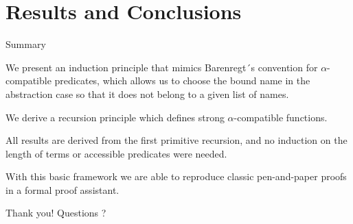 \documentclass[utf,utf8x,hyperref=hidelinks,xcolor=table]{beamer} %
\newcommand{\alp}{\ensuremath{\alpha}}
\begin{document}
\section{Results and Conclusions} 
\begin{frame}{Summary} \medskip


We present an induction principle that mimics Barenregt´s convention for $\alpha$-compatible predicates, which allows us to choose the bound name in the abstraction case so that it does not belong to a given list of names. \bigskip \bigskip

\pause

We derive a recursion principle which defines strong \alp-compatible functions. \bigskip
\pause

All results are derived from the first primitive recursion, and no induction on the length of terms or accessible predicates were needed. \bigskip \bigskip

\pause

With this basic framework we are able to reproduce classic pen-and-paper proofs in a formal proof assistant.
\end{frame}


\begin{frame}{Thank you!}
  Questions ? 
\end{frame}



\end{document}
